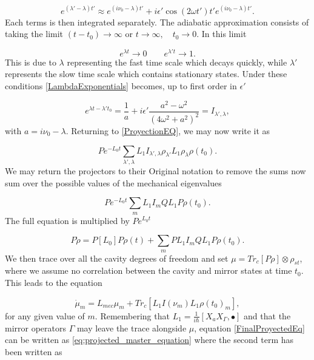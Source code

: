 \documentclass[reprint, amsmath,amssymb, aps,pra]{revtex4-1}
\begin{document}
\begin{equation}
e^{(\lambda'-\lambda)t'} \approx e^{(i\nu_0-\lambda)t'} + i\epsilon' \cos(2 \omega t')t' e^{(i\nu_0-\lambda)t'}.
\end{equation} Each terms is then integrated separately. The adiabatic approximation consists of taking the limit $(t-t_0) \to \infty$ or $t \to \infty, \quad t_0 \to 0$. In this limit

\begin{equation}
e^{\lambda t} \to 0 \qquad e^{\lambda' t} \to 1.
\end{equation} This is due to $\lambda$ representing the fast time scale which decays quickly, while $\lambda'$ represents the slow time scale which contains stationary states. Under these conditions \eqref{LambdaExponentials} becomes, up to first order in $\epsilon'$

\begin{equation}
[\int_{t_0}^t dt' e^{(\lambda'-\lambda)t'}]e^{\lambda t- \lambda't_0} = \frac{1}{a} + i\epsilon' \frac{a^2 - \omega^2}{(4\omega^2 + a^2)^2} = I_{\lambda',\lambda},
\end{equation} with $a = i\nu_0 - \lambda$. Returning to \eqref{ProyectionEQ}, we may now write it as

\begin{equation}
Pe^{-L_0 t} \sum_{\lambda',\lambda} L_1 I_{\lambda',\lambda} \rho_{\lambda'} L_1 \rho_\lambda \rho(t_0).
\end{equation} We may return the projectors to their Original notation to remove the sums now sum over the possible values of the mechanical eigenvalues

\begin{equation}
Pe^{-L_0 t} \sum_{m} L_1 I_{m} Q L_1 P \rho(t_0).
\end{equation} The full equation is multiplied by $Pe^{L_0 t}$ 

\begin{equation}
P\dot{\rho} = P[L_0]P \rho(t) + \sum_{m} P L_1 I_{m} Q L_1 P \rho(t_0).
\end{equation} We then trace over all the cavity degrees of freedom and set  $\mu = Tr_c[P\rho]\otimes \rho_{st}$, where we assume no correlation between the cavity and mirror states at time $t_0$. This leads to the equation

\begin{equation}\label{FinalProyectedEq}
\dot{\mu}_m = L_{mec}\mu_m + Tr_c[ L_1 I(\nu_m) L_1  \rho(t_0)_m],
\end{equation} for any given value of $m$. Remembering that $L_1 = \frac{1}{i\hbar}[X_a X_\Gamma,\bullet]$ and that the mirror operators $\Gamma$ may leave the trace alongside $\mu$, equation \eqref{FinalProyectedEq} can be written as \eqref{eq:projected_master_equation} where the second term has been written as
\end{document}
